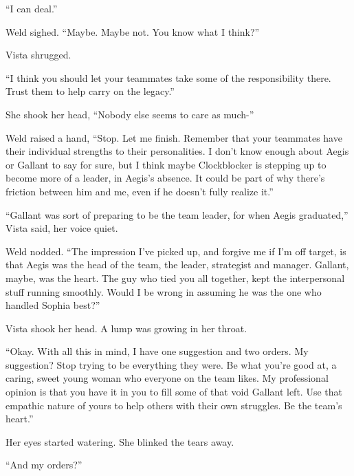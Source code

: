 ``I can deal.''



Weld sighed.  ``Maybe.  Maybe not.  You know what I think?''



Vista shrugged.



``I think you should let your teammates take some of the responsibility there.  Trust them to help carry on the legacy.''



She shook her head, ``Nobody else seems to care as much-''



Weld raised a hand, ``Stop.  Let me finish.  Remember that your teammates have their individual strengths to their personalities.  I don't know enough about Aegis or Gallant to say for sure, but I think maybe Clockblocker is stepping up to become more of a leader, in Aegis's absence.  It could be part of why there's friction between him and me, even if he doesn't fully realize it.''



``Gallant was sort of preparing to be the team leader, for when Aegis graduated,'' Vista said, her voice quiet.



Weld nodded.  ``The impression I've picked up, and forgive me if I'm off target, is that Aegis was the head of the team, the leader, strategist and manager.  Gallant, maybe, was the heart.  The guy who tied you all together, kept the interpersonal stuff running smoothly.  Would I be wrong in assuming he was the one who handled Sophia best?''



Vista shook her head.  A lump was growing in her throat.



``Okay.  With all this in mind, I have one suggestion and two orders.  My suggestion?  Stop trying to be everything they were.  Be what you're good at, a caring, sweet young woman who everyone on the team likes.  My professional opinion is that you have it in you to fill some of that void Gallant left.  Use that empathic nature of yours to help others with their own struggles.  Be the team's heart.''



Her eyes started watering.  She blinked the tears away.



``And my orders?''



